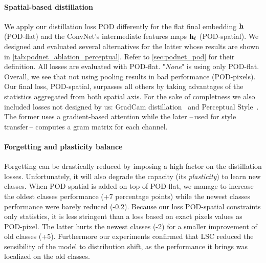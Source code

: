\paragraph{Spatial-based distillation} We apply our distillation loss POD differently for the flat
final embedding $\mathbf{h}$ (POD-flat) and the ConvNet's intermediate features maps $\mathbf{h}_\ell$
(POD-spatial). We designed and evaluated several alternatives for the latter whose results are shown
in \autoref{tab:podnet_ablation_perceptual}. Refer to \autoref{sec:podnet_pod}
for their definition. All losses are evaluated with POD-flat. "\textit{None}" is using only
POD-flat.
Overall, we see that not using pooling results in bad performance (POD-pixels). Our final loss,
POD-spatial, surpasses all others by taking advantages of the statistics aggregated from both
spatial axis. For the sake of completness we also included losses not designed by us: GradCam
distillation~\citep{dhar2019learning_without_memorizing_gradcam} and Perceptual
Style~\citep{johnson2016perceptual_losses}. The former uses a gradient-based attention while the
later --\,used for style transfer\,-- computes a gram matrix for each channel.

\paragraph{Forgetting and plasticity balance} Forgetting can be drastically reduced by imposing a
high factor on the distillation losses. Unfortunately, it will also degrade the capacity (its
\textit{plasticity}) to learn new classes. When POD-spatial is added on top of POD-flat, we manage
to increase the oldest classes performance (+7 percentage points) while the newest classes
performance were barely reduced (-0.2\pp). Because our loss POD-spatial constraints only statistics,
it is less stringent than a loss based on exact pixels values as POD-pixel. The latter hurts the
newest classes (-2\pp) for a smaller improvement of old classes (+5\pp). Furthermore our experiments
confirmed that LSC reduced the sensibility of the model to distribution shift, as the performance it
brings was localized on the old classes.

